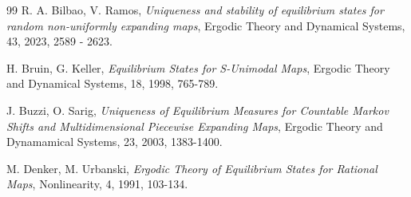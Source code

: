 \documentclass[12pt,a4paper]{amsart}
\theoremstyle{plain}
\begin{document}
\begin{thebibliography}{99}
		 {\sc R. A. Bilbao, V. Ramos}, {\it Uniqueness and stability of equilibrium states for random non-uniformly expanding maps}, Ergodic Theory and Dynamical Systems, 43, 2023,  2589 - 2623.
		
		
		
		 {\sc H. Bruin, G. Keller}, {\it Equilibrium States for S-Unimodal Maps}, Ergodic Theory and Dynamical Systems, 18, 1998, 765-789.
		
		
		 {\sc J. Buzzi, O. Sarig}, {\it Uniqueness of Equilibrium Measures for Countable Markov Shifts and Multidimensional Piecewise Expanding Maps}, Ergodic Theory and Dynamamical Systems, 23, 2003, 1383-1400.
		
		
		 {\sc M. Denker, M. Urbanski}, {\it Ergodic Theory of Equilibrium States for Rational Maps}, Nonlinearity, 4, 1991, 103-134.
		
		
		
		
		
		
		
		
		

\end{thebibliography}
\end{document}
